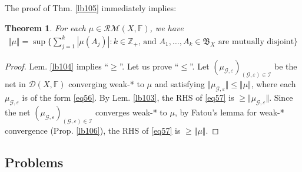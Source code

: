\documentclass[12pt,b5paper,notitlepage]{article}
\theoremstyle{definition}
\newtheorem{prob}{\color{red}Problem}[section]
\theoremstyle{plain}
\newtheorem{thm}[df]{Theorem}
\newcommand{\fk}{\mathfrak}
\newcommand{\ovl}{\overline}
\newcommand{\Zbb}{\mathbb Z}
\newcommand{\Rbb}{\mathbb R}
\newcommand{\Fbb}{\mathbb F}
\newcommand{\eps}{\varepsilon}
\newcommand{\MG}{\mathcal G}
\newcommand{\MD}{\mathcal D}
\newcommand{\RM}{\mathcal {RM}}
\newcommand{\SI}{\mathscr I}
\newcommand{\SA}{\mathscr A}
\numberwithin{equation}{section}
\begin{document}
The proof of Thm. \ref{lb105} immediately implies:


\begin{thm}
For each $\mu\in\RM(X,\Fbb)$, we have
\begin{align}\label{eq57}
\Vert\mu\Vert=\sup\Big\{\sum_{j=1}^k|\mu(A_j)|:k\in\Zbb_+\text{, and $A_1,\dots,A_k\in\fk B_X$ are mutually disjoint}\Big\}
\end{align}
\end{thm}

\begin{proof}
Lem. \ref{lb104} implies ``$\geq$''. Let us prove ``$\leq$''. Let $(\mu_{\MG,\eps})_{(\MG,\eps)\in\SI}$ be the net in $\MD(X,\Fbb)$ converging weak-* to $\mu$ and satisfying $\Vert\mu_{\MG,\eps}\Vert\leq\Vert\mu\Vert$, where each $\mu_{\MG,\eps}$ is of the form \eqref{eq56}. By Lem. \ref{lb103}, the RHS of \eqref{eq57} is $\geq\Vert\mu_{\MG,\eps}\Vert$. Since the net $(\mu_{\MG,\eps})_{(\MG,\eps)\in\SI}$ converges weak-* to $\mu$, by Fatou's lemma for weak-* convergence (Prop. \ref{lb106}), the RHS of \eqref{eq57} is $\geq\Vert\mu\Vert$.
\end{proof}



\subsection{Problems}

\begin{comment}
\begin{prob}
Let $X$ be an LCH space. Let $f:X\rightarrow\ovl\Rbb_{\geq0}$ be lower semicontinuous. Prove that there exists an increasing net of continuous functions $X\rightarrow\Rbb_{\geq0}$ converging pointwise to $f$.
\end{prob}

\begin{proof}[Hint]
Let $\SA=\{g\in C_c(X,\Rbb_{\geq0}):g\leq f\}$. Consider $(g)_{g\in\SA}$.
\end{proof}
\end{comment}
\end{document}
